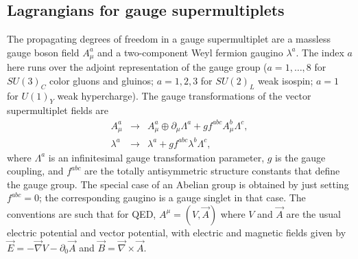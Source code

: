 \documentclass[11pt]{article}
\renewcommand{\theequation}{\arabic{section}.\arabic{equation}}
\def\BDminus{-}
\def\BDminus{+}
\def\BDminus{\ominus}
\def\BDminus{\oplus}
\def\beq{\begin{eqnarray}}
\def\eeq{\end{eqnarray}}
\begin{document}
\subsection{Lagrangians for gauge
supermultiplets}\label{subsec:susylagr.gauge}
\setcounter{footnote}{1}
\renewcommand{\theequation}{\arabic{section}.\arabic{subsection}.\arabic{equation}}
\setcounter{equation}{0}

The propagating degrees of freedom in a gauge supermultiplet are a
massless gauge boson field $A_\mu^a$ and a two-component Weyl fermion
gaugino $\lambda^a$. The index $a$ here runs over the adjoint
representation of the gauge group ($a=1,\ldots ,8$ for $SU(3)_C$ color
gluons and gluinos; $a=1,2,3$ for $SU(2)_L$ weak isospin; $a=1$ for
$U(1)_Y$ weak hypercharge). The gauge transformations of the vector
supermultiplet fields are
\beq
A^a_\mu &\rightarrow&  A^a_\mu
\BDminus \partial_\mu \Lambda^a + g f^{abc} A^b_\mu \Lambda^c ,
\label{Agaugetr}
\\
\lambda^a &\rightarrow& \lambda^a + g f^{abc} \lambda^b \Lambda^c
,
\label{lamgaugetr}
\eeq
where $\Lambda^a$ is an infinitesimal gauge transformation parameter, $g$
is the gauge coupling, and $f^{abc}$ are the totally antisymmetric
structure constants that define the gauge group. The special case of an
Abelian group is obtained by just setting $f^{abc}=0$;  the corresponding
gaugino is a gauge singlet in that case. The conventions are such that for
QED, $A^\mu = (V, \vec{A})$ where $V$ and $\vec{A}$ are the usual electric
potential and vector potential, with electric and magnetic fields given by
$\vec{E} = -\vec{\nabla} V - \partial_0 \vec{A}$ and $\vec{B} =
\vec{\nabla} \times \vec{A}$. 
\end{document}
